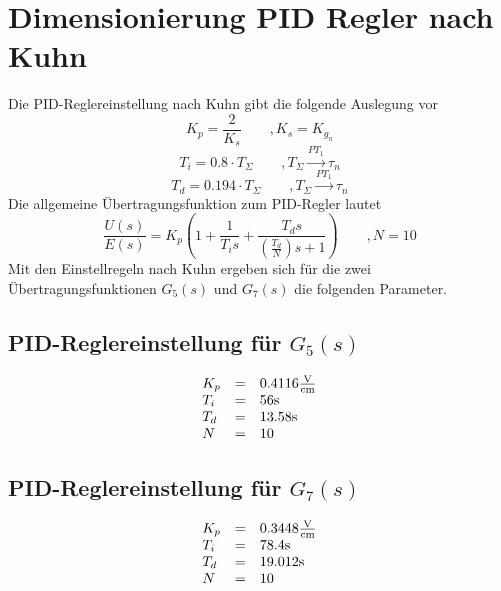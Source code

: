 \section{Dimensionierung PID Regler nach Kuhn}
Die PID-Reglereinstellung nach Kuhn gibt die folgende Auslegung vor
\[ K_p = \frac{2}{K_s} \qquad ,K_s = K_{g_n} \]
\[ T_i = 0.8 \cdot T_\Sigma \qquad ,T_\Sigma \xrightarrow{PT_1} \tau_n\]
\[ T_d = 0.194 \cdot T_\Sigma \qquad ,T_\Sigma \xrightarrow{PT_1} \tau_n \]
Die allgemeine Übertragungsfunktion zum PID-Regler lautet
\[
	\frac{U(s)}{E(s)}
	= K_p \left(
		1 + \frac{1}{T_i s}
		+ \frac{T_d s}{\left(\frac{T_d}{N}\right)s + 1}
	\right)
	\qquad , N = 10
\]
Mit den Einstellregeln nach Kuhn ergeben sich für die zwei
Übertragungsfunktionen $G_5(s)$ und $G_7(s)$ die folgenden Parameter.

\subsection{PID-Reglereinstellung für $G_5(s)$}
\[
	\begin{array}{l c l}
		K_p & = & 0.4116 \si[per-mode = fraction]{\volt\per\cm} \\
		T_i & = & 56 \si{\second} \\
		T_d & = & 13.58 \si{\second} \\
		N & = & 10
	\end{array}
\]

\subsection{PID-Reglereinstellung für $G_7(s)$}
\[
	\begin{array}{l c l}
		K_p & = & 0.3448 \si[per-mode = fraction]{\volt\per\cm} \\
		T_i & = & 78.4 \si{\second} \\
		T_d & = & 19.012 \si{\second} \\
		N & = & 10
	\end{array}
\]
